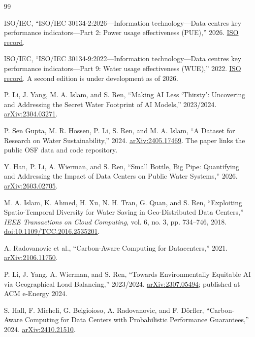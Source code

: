 \documentclass[10pt]{article}
\begin{document}
\begin{thebibliography}{99}
\small

ISO/IEC, ``ISO/IEC 30134-2:2026---Information technology---Data centres key performance indicators---Part 2: Power usage effectiveness (PUE),'' 2026. \href{https://www.iso.org/standard/30134-2}{ISO record}.

ISO/IEC, ``ISO/IEC 30134-9:2022---Information technology---Data centres key performance indicators---Part 9: Water usage effectiveness (WUE),'' 2022. \href{https://www.iso.org/standard/77692.html}{ISO record}. A second edition is under development as of 2026.

P. Li, J. Yang, M. A. Islam, and S. Ren, ``Making AI Less `Thirsty': Uncovering and Addressing the Secret Water Footprint of AI Models,'' 2023/2024. \href{https://arxiv.org/abs/2304.03271}{arXiv:2304.03271}.

P. Sen Gupta, M. R. Hossen, P. Li, S. Ren, and M. A. Islam, ``A Dataset for Research on Water Sustainability,'' 2024. \href{https://arxiv.org/abs/2405.17469}{arXiv:2405.17469}. The paper links the public OSF data and code repository.

Y. Han, P. Li, A. Wierman, and S. Ren, ``Small Bottle, Big Pipe: Quantifying and Addressing the Impact of Data Centers on Public Water Systems,'' 2026. \href{https://arxiv.org/abs/2603.02705}{arXiv:2603.02705}.

M. A. Islam, K. Ahmed, H. Xu, N. H. Tran, G. Quan, and S. Ren, ``Exploiting Spatio-Temporal Diversity for Water Saving in Geo-Distributed Data Centers,'' \emph{IEEE Transactions on Cloud Computing}, vol. 6, no. 3, pp. 734--746, 2018. \href{https://doi.org/10.1109/TCC.2016.2535201}{doi:10.1109/TCC.2016.2535201}.

A. Radovanovic et al., ``Carbon-Aware Computing for Datacenters,'' 2021. \href{https://arxiv.org/abs/2106.11750}{arXiv:2106.11750}.

P. Li, J. Yang, A. Wierman, and S. Ren, ``Towards Environmentally Equitable AI via Geographical Load Balancing,'' 2023/2024. \href{https://arxiv.org/abs/2307.05494}{arXiv:2307.05494}; published at ACM e-Energy 2024.

S. Hall, F. Micheli, G. Belgioioso, A. Radovanovic, and F. D\"orfler, ``Carbon-Aware Computing for Data Centers with Probabilistic Performance Guarantees,'' 2024. \href{https://arxiv.org/abs/2410.21510}{arXiv:2410.21510}.


\end{thebibliography}
\end{document}
